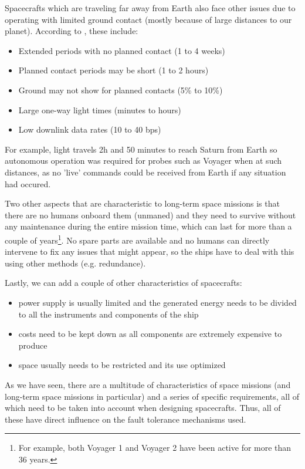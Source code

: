 Spacecrafts which are traveling far away from Earth also face other issues due
to operating with limited ground contact (mostly because of large distances to
our planet). According to \cite{fm-jpl}, these include:
\begin{itemize}
  \item Extended periods with no planned contact (1 to 4 weeks)
  \item Planned contact periods may be short (1 to 2 hours)
  \item Ground may not show for planned contacts (5\% to 10\%)
  \item Large one-way light times (minutes to hours)
  \item Low downlink data rates (10 to 40 bps)
\end{itemize}
For example, light travels 2h and 50 minutes to reach Saturn from Earth so
autonomous operation was required for probes such as Voyager when at such
distances, as no 'live' commands could be received from Earth if any situation
had occured.

Two other aspects that are characteristic to long-term space missions is that
there are no humans onboard them (unmaned) and they need to survive without any
maintenance during the entire mission time, which can last for more than a
couple of years\footnote{For example, both Voyager 1 and Voyager 2 have been
active for more than 36 years.}. No spare parts are available and no humans can
directly intervene to fix any issues that might appear, so the ships have to
deal with this using other methods (e.g. redundance).

Lastly, we can add a couple of other characteristics of spacecrafts: 
\begin{itemize}
  \item power supply is usually limited and the generated energy needs to be
  divided to all the instruments and components of the ship
  \item costs need to be kept down as all components are extremely expensive to
  produce
  \item space usually needs to be restricted and its use optimized
\end{itemize}

As we have seen, there are a multitude of characteristics of space missions (and
long-term space missions in particular) and a series of specific requirements,
all of which need to be taken into account when designing spacecrafts. Thus, all
of these have direct influence on the fault tolerance mechanisms used.
